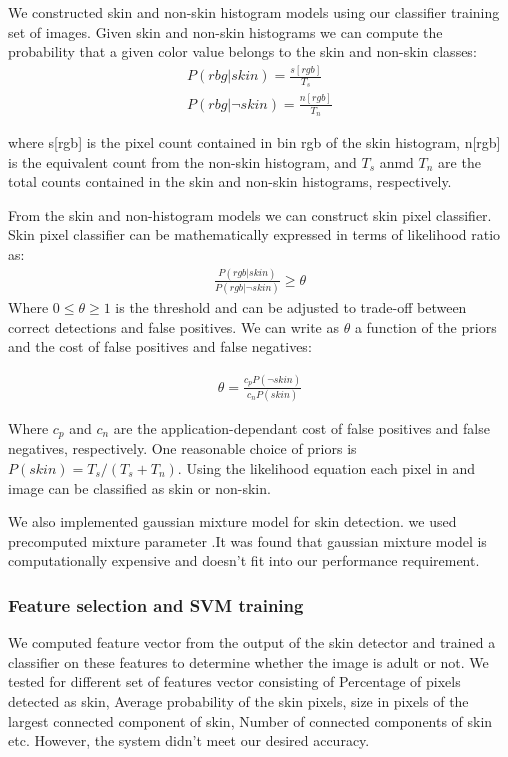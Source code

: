 We constructed skin and non-skin histogram models using our classifier training
set of images.  Given skin and non-skin histograms we can compute the probability that a given color value belongs to the skin and non-skin classes:
\begin{align}
P(rbg|skin)=\frac{s[rgb]}{T_{s}} \\
P(rbg|\neg skin)=\frac{n[rgb]}{T_{n}}
\end{align}

where s[rgb] is the pixel count contained in bin rgb of the skin histogram, n[rgb]  is the equivalent count from the non-skin histogram, and ${T_{s}}$ anmd ${T_{n}}$ are the total counts contained in the skin and non-skin histograms, respectively.

From the skin and non-histogram models we can construct skin pixel classifier. Skin pixel classifier can be mathematically expressed in terms of likelihood ratio as:
\begin{align}
            \frac{P(rgb|skin)}{ P(rgb|\neg skin)}\ge\theta
\end{align}
Where $ 0\le\theta\ge1 $ is the threshold and can be adjusted to trade-off between correct detections and false positives. We can write  as $\theta$ a function of the priors and the cost of false positives and false negatives:


\begin{align}
\theta=\frac{c_{p}P(\neg skin)}{ c_{n}P(skin)}
\end{align}
     
Where ${c_{p}}$ and ${c_{n}}$ are the application-dependant cost of false positives and false negatives, respectively. One reasonable choice of priors is $P(skin)= {T_{s}}/({T_{s}}+{T_{n}})$.
Using the likelihood equation each pixel in and image can be classified as skin or non-skin.
\par
We also implemented gaussian mixture model for skin detection. we used
precomputed mixture parameter \cite{Statistical}.It was found that gaussian
mixture model is computationally expensive and doesn't fit into our performance requirement.
 
\subsubsection{Feature selection and SVM training}
            We computed feature vector from the output of the skin detector and trained a classifier on these features to
             determine whether the image is adult or not. We tested for different set of features vector 
             consisting of Percentage of pixels detected as skin, Average probability of the skin pixels, 
             size in pixels of the largest connected component of skin, Number of connected components of skin etc. 
             However, the system didn't meet our desired accuracy.

